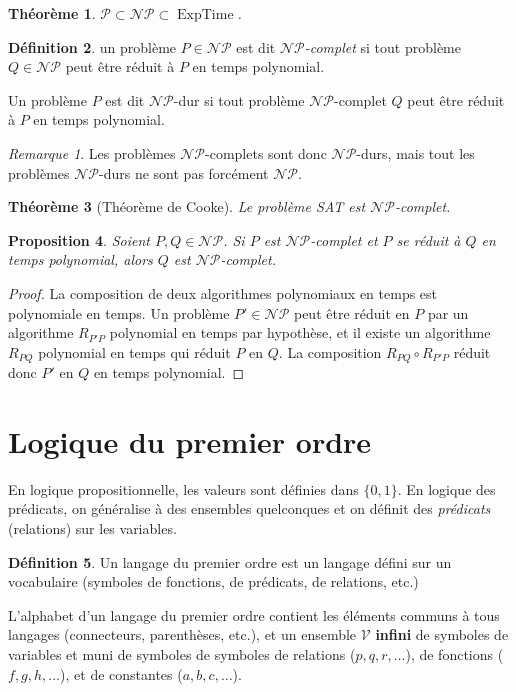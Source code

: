 \documentclass{article}
\newtheorem{thm}{Théorème}[section]
\newtheorem{prp}[thm]{Proposition}
\theoremstyle{definition}
\newtheorem{déf}[thm]{Définition}
\theoremstyle{remark}
\newtheorem*{rmq}{Remarque}
\newcommand{\NP}{\mathcal {NP}}
\DeclareMathOperator{\ExpTime}{ExpTime}
\begin{document}
	\begin{thm} $\mathcal P \subset \NP \subset \ExpTime$.
	\end{thm}

	\begin{déf} un problème $P \in \NP$ est dit \textit{$\NP$-complet} si tout problème $Q \in \NP$ peut être réduit à $P$ en temps polynomial.

	Un problème $P$ est dit $\NP$-dur si tout problème $\NP$-complet $Q$ peut être réduit à $P$ en temps polynomial.
	\end{déf}

	\begin{rmq} Les problèmes $\NP$-complets sont donc $\NP$-durs, mais tout les problèmes $\NP$-durs ne sont pas forcément $\NP$.
	\end{rmq}

	\begin{thm}[Théorème de Cooke] Le problème SAT est $\NP$-complet.
	\end{thm}

	\begin{prp} Soient $P, Q \in \NP$. Si $P$ est $\NP$-complet et $P$ se réduit à $Q$ en temps polynomial, alors $Q$ est $\NP$-complet.
	\end{prp}

	\begin{proof} La composition de deux algorithmes polynomiaux en temps est polynomiale en temps. Un problème $P' \in \NP$ peut être
	réduit en $P$ par un algorithme $R_{P'P}$ polynomial en temps par hypothèse, et il existe un algorithme $R_{PQ}$ polynomial en temps
	qui réduit $P$ en $Q$. La composition $R_{PQ} \circ R_{P'P}$ réduit donc $P'$ en $Q$ en temps polynomial.
	\end{proof}

\section{Logique du premier ordre}
	En logique propositionnelle, les valeurs sont définies dans $\{0, 1\}$. En logique des prédicats, on généralise à des ensembles quelconques et on définit
	des \textit{prédicats} (relations) sur les variables.

	\begin{déf} Un langage du premier ordre est un langage défini sur un vocabulaire (symboles de fonctions, de prédicats, de relations, etc.)
	\end{déf}

	L'alphabet d'un langage du premier ordre contient les éléments communs à tous langages (connecteurs, parenthèses, etc.), et un ensemble $\mathcal V$
	\textbf{infini} de symboles de variables et muni de symboles de symboles de relations ($p, q, r, \ldots$), de fonctions ($f, g, h, \ldots$), et de
	constantes ($a, b, c, \ldots$).
\end{document}
